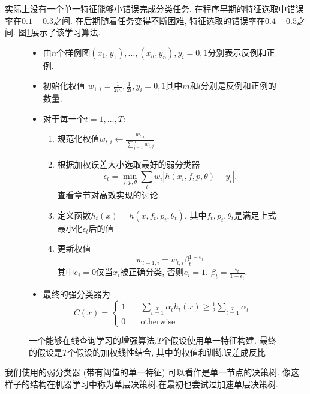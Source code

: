 \documentclass[a4paper,utf8,11pt]{ctexart}
\begin{document}
实际上没有一个单一特征能够小错误完成分类任务. 在程序早期的特征选取中错误率在$0.1-0.3$之间. 在后期随着任务变得不断困难, 特征选取的错误率在$0.4-0.5$之间. 图\ref{fig:adaboost}展示了该学习算法.
\begin{figure}[htb]
\kaishu{}
    \caption{一个能够在线查询学习的增强算法.$T$个假设使用单一特征构建. 最终的假设是$T$个假设的加权线性结合, 其中的权值和训练误差成反比}
    \label{fig:adaboost}
    \begin{itemize}
        \item 由$n$个样例图$(x_1,y_1),\ldots,(x_n,y_n), y_i=0, 1$分别表示反例和正例.
        \item 初始化权值 $w_{1,i}=\frac{1}{2m}, \frac{1}{2l},y_i=0,1$其中$m$和$l$分别是反例和正例的数量.
        \item 对于每一个$t=1,\ldots,T$:
            \begin{enumerate}
                \item 规范化权值$w_{t,i}\leftarrow \frac{w_{t,i}}{\sum_{j=1}^n w_{t,j}}$
                \item 根据加权误差大小选取最好的弱分类器
                    \[
                        \epsilon_t=\min_{f,p,\theta}\sum_i{w_i| h(x_i,f,p,\theta)-y_i |}.
                    \]
                    查看章节对高效实现的讨论
                \item 定义函数$h_t(x)=h(x,f_t,p_t,\theta_t)$, 其中$f_t,p_t,\theta_t$是满足上式最小化$\epsilon_t$后的值
                \item 更新权值
                    \[
                        w_{t+1,i}=w_{t,i}\beta_t^{1-e_i}
                    \]
                    其中$e_i=0$仅当$x_i$被正确分类, 否则$e_i=1$. $\beta_t=\frac{\epsilon_t}{1-\epsilon_t}$.
            \end{enumerate}
        \item 最终的强分类器为
            \[
                C(x)=
                \begin{cases}
                    1 &\quad\sum\limits_{t=1}\limits^T \alpha_t h_t(x)\geq \frac12\sum\limits_{t=1}\limits^T\alpha_t\\
                    0 &\quad\text{otherwise}
                \end{cases}
            \]
    \end{itemize}
\end{figure}

我们使用的弱分类器 (带有阈值的单一特征) 可以看作是单一节点的决策树. 像这样子的结构在机器学习中称为单层决策树.\citet{freund1995desicion}在最初也尝试过加速单层决策树.
\end{document}
